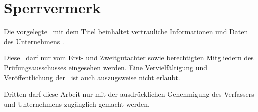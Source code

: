 \section*{Sperrvermerk}
Die vorgelegte \myworktype ~mit dem Titel \glqq\textit{{\mytitle}}\grqq{} beinhaltet vertrauliche Informationen und Daten des Unternehmens \mydualpartner.

Diese \myworktype ~darf nur vom Erst- und Zweitgutachter sowie berechtigten Mitgliedern des Prüfungsausschusses eingesehen werden. Eine Vervielfältigung und Veröffentlichung der \myworktype ~ist auch auszugsweise nicht erlaubt.

Dritten darf diese Arbeit nur mit der ausdrücklichen Genehmigung des Verfassers und Unternehmens zugänglich gemacht werden.

\newpage